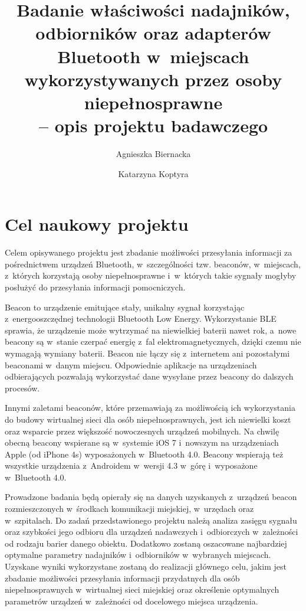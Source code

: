 \documentclass[a4paper]{article}
\begin{document}
\title{Badanie właściwości nadajników, odbiorników oraz adapterów Bluetooth w~miejscach wykorzystywanych przez osoby niepełnosprawne \\-- opis projektu badawczego}
\author{Agnieszka Biernacka \and Katarzyna Koptyra}
\maketitle

\section{Cel naukowy projektu}
Celem opisywanego projektu jest zbadanie możliwości przesyłania informacji za pośrednictwem urządzeń Bluetooth, w~szczególności tzw. beaconów, w~miejscach, z~których korzystają osoby niepełnosprawne i~w~których takie sygnały mogłyby posłużyć do przesyłania informacji pomocniczych. 

Beacon to urządzenie emitujące stały, unikalny sygnał korzystając z~energooszczędnej technologii Bluetooth Low Energy. Wykorzystanie BLE sprawia, że urządzenie może wytrzymać na niewielkiej baterii nawet rok, a~nowe beacony są w~stanie czerpać energię z~fal elektromagnetycznych, dzięki czemu nie wymagają wymiany baterii.
Beacon nie łączy się z~internetem ani pozostałymi beaconami w~danym miejscu. Odpowiednie aplikacje na urządzeniach odbierających  pozwalają wykorzystać dane wysyłane przez beacony do dalszych procesów.

Innymi zaletami beaconów, które przemawiają za możliwością ich wykorzystania do budowy wirtualnej sieci dla osób niepełnosprawnych, jest ich niewielki koszt oraz wsparcie przez większość nowoczesnych urządzeń mobilnych. Na chwilę obecną beacony wspierane są w~systemie iOS 7 i~nowszym na urządzeniach Apple (od iPhone 4s) wyposażonych w~Bluetooth 4.0. Beacony wspierają też wszystkie urządzenia z~Androidem w~wersji 4.3 w~górę i~wyposażone w~Bluetooth 4.0.

Prowadzone badania będą opierały się na danych uzyskanych z~urządzeń beacon rozmieszczonych w~środkach komunikacji miejskiej, w~urzędach oraz w~szpitalach. Do zadań przedstawionego projektu należą analiza zasięgu sygnału oraz szybkości jego odbioru dla urządzeń nadawczych i~odbiorczych w~zależności od rodzaju barier danego obiektu. Dodatkowo zostaną oszacowane najbardziej optymalne parametry nadajników i~odbiorników w~wybranych miejscach. Uzyskane wyniki wykorzystane zostaną do realizacji głównego celu, jakim jest zbadanie możliwości przesyłania informacji przydatnych dla osób niepełnosprawnych w~wirtualnej sieci miejskiej oraz określenie optymalnych parametrów urządzeń w~zależności od docelowego miejsca urządzenia.
\end{document}
